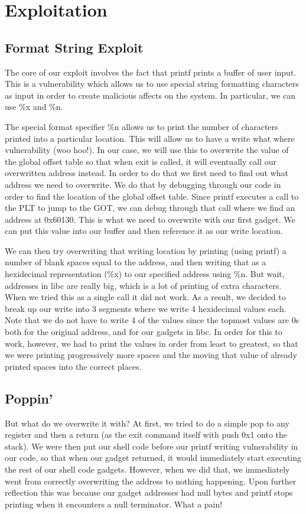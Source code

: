 \section{Exploitation}
\subsection{Format String Exploit}
The core of our exploit involves the fact that printf prints a buffer of user input. This is a vulnerability which allows us to use special string formatting characters as input in order to create malicious affects on the system. In particular, we can use \%x and \%n. 

The special format specifier \%n allows us to print the number of characters printed into a particular location. This will allow us to have a write what where vulnerability (woo hoo!). In our case, we will use this to overwrite the value of the global offset table so that when exit is called, it will eventually call our overwritten address instead. In order to do that we first need to find out what address we need to overwrite. We do that by debugging through our code in order to find the location of the global offset table. Since printf executes a call to the PLT to jump to the GOT, we can debug through that call where we find an address at 0x60130. This is what we need to overwrite with our first gadget. We can put this value into our buffer and then reference it as our write location. 

We can then try overwriting that writing location by printing (using printf) a number of blank spaces equal to the address, and then writing that as a hexidecimal representation (\%x) to our specified address using \%n. But wait, addresses in libc are really big, which is a lot of printing of extra characters. When we tried this as a single call it did not work. As a result, we decided to break up our write into 3 segments where we write 4 hexidecimal values each. Note that we do not have to write 4 of the values since the topmost values are 0s both for the original address, and for our gadgets in libc. In order for this to work, however, we had to print the values in order from least to greatest, so that we were printing progressively more spaces and the moving that value of already printed spaces into the correct places.

\subsection{Poppin'}
But what do we overwrite it with? At first, we tried to do a simple pop to any register and then a return (as the exit command itself with push 0x1 onto the stack). We were then put our shell code before our printf writing vulnerability in our code, so that when our gadget returned, it would immediately start executing the rest of our shell code gadgets. However, when we did that, we immediately went from correctly overwriting the address to nothing happening. Upon further reflection this was because our gadget addresses had null bytes and printf stops printing when it encounters a null terminator. What a pain! 

